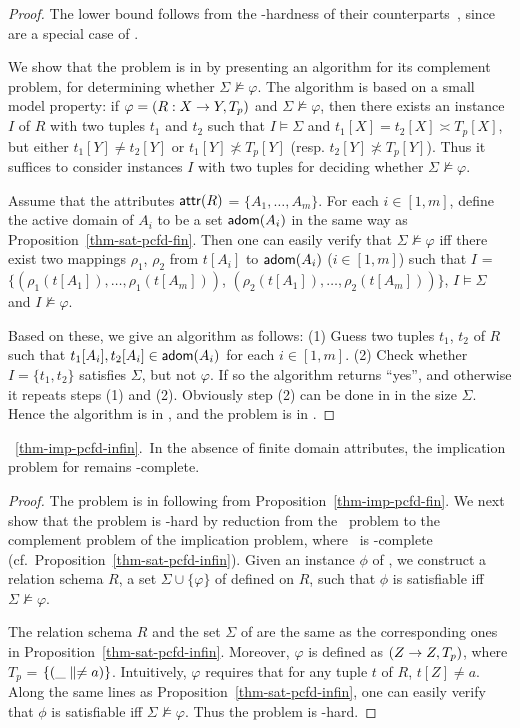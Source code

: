 \begin{proof}
The lower bound follows from the \coNP-hardness of their \CFDs
counterparts~\cite{CFDs}, since \CFDs are a special case of \pCFDs.

We show that the problem is in \coNP by presenting an \NP algorithm
for its complement problem, \ie for determining whether
$\Sigma\not\models\varphi$. The algorithm is based on a small model
property: if $\varphi = (R: X \rightarrow Y, T_p)$ and $\Sigma
\not\models\varphi$, then there exists an instance $I$ of $R$ with
two tuples $t_1$ and $t_2$ such that $I\models\Sigma$ and $t_1[X] =
t_2[X] \asymp T_p[X]$, but either $t_1[Y]\ne t_2[Y]$ or
$t_1[Y]\not\asymp T_p[Y]$ (resp. $t_2[Y]\not\asymp T_p[Y]$). Thus it
suffices to consider instances $I$ with two tuples for deciding
whether $\Sigma\not\models\varphi$.

Assume \kwlog that the attributes $\protect\mathsf{attr}(R)$ = $\{A_1,\dots,
A_m\}$. For each $i\in [1, m]$, define the active domain of $A_i$ to
be a set ${\mathsf{adom}}(A_i)$ in the same way as
Proposition~\ref{thm-sat-pcfd-fin}. Then one can easily verify that
$\Sigma\not\models\varphi$ iff there exist two mappings $\rho_1$,
$\rho_2$ from $t[A_i]$ to ${\mathsf{adom}}(A_i)$ ($i\in [1, m]$) such that $I$
= $\{(\rho_1(t[A_1]), \ldots, \rho_1(t[A_m]))$, $(\rho_2(t[A_1]),
\ldots, \rho_2(t[A_m]))\}$, $I \models\Sigma$ and
$I\not\models\varphi$.

Based on these, we give an \NP algorithm as follows: (1) Guess two
tuples $t_1$, $t_2$ of $R$ such that $t_1[A_i],t_2[A_i]
\in{\ensuremath {\mathsf{adom}}}(A_i)$ for each $i \in [1, m]$. (2) Check whether $I =
\{t_1, t_2\}$ satisfies $\Sigma$, but not $\varphi$. If so the
algorithm returns ``yes'', and otherwise it repeats steps (1) and
(2). Obviously step (2) can be done in \PTIME in the size $\Sigma$.
Hence the algorithm is in \NP, and the problem is in \coNP.\eop
\end{proof}


\vspace{2ex} \noindent{}~\ref{thm-imp-pcfd-infin}.~In the
absence of finite domain attributes, the implication problem for
\pCFDs remains \coNP-complete. \eop

\begin{proof}
The problem is in \coNP following from
Proposition~\ref{thm-imp-pcfd-fin}. We next show that the problem is
\coNP-hard by reduction from the \kSAT\ problem to the complement
problem of the implication problem, where \kSAT\ is \NP-complete
(cf.~Proposition~\ref{thm-sat-pcfd-infin}). Given an instance $\phi$
of \kSAT, we construct a relation schema $R$, a set
$\Sigma\cup\{\varphi\}$ of \pCFDs defined on $R$, such that $\phi$
is satisfiable iff $\Sigma\not\models\varphi$.


The relation schema $R$ and the set $\Sigma$ of \pCFDs are the same
as the corresponding ones in Proposition~\ref{thm-sat-pcfd-infin}.
Moreover, $\varphi$ is defined as $(Z \rightarrow Z, T_p)$, where $T_{p}$ =
$\{(\_ \parallel \ne a)\}$. Intuitively, $\varphi$ requires that for any
tuple $t$ of $R$, $t[Z] \ne a$. Along the same lines as
Proposition~\ref{thm-sat-pcfd-infin}, one can easily verify that
$\phi$ is satisfiable iff $\Sigma\not\models\varphi$. Thus the
problem is \coNP-hard. \eop
\end{proof}


